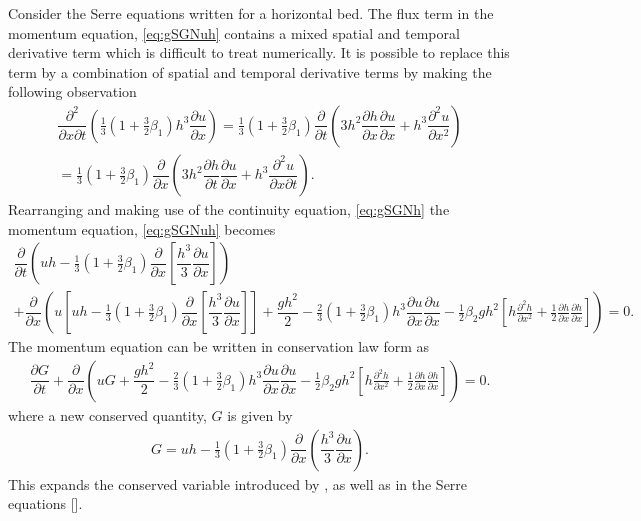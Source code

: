 \documentclass[10pt]{article}
\begin{document}
Consider the Serre equations written for a horizontal bed. The flux term in the momentum equation, \eqref{eq:gSGNuh} contains a mixed spatial and temporal derivative term which is difficult to treat numerically. It is possible to replace this term  by a combination of spatial and temporal derivative terms by making the following observation
\begin{multline}
\dfrac{\partial^2}{\partial x \partial t} \left ( \frac{1}{3}\left(1 + \frac{3}{2} \beta_1\right) h^3 \dfrac{\partial u}{\partial x} \right ) =   \frac{1}{3}\left(1 + \frac{3}{2} \beta_1\right) \dfrac{\partial }{\partial t} \left ( 3h^2 \dfrac{\partial h}{\partial x} \dfrac{\partial u}{\partial x} + h^3 \dfrac{\partial^2 u}{\partial x^2} \right ) \\=  \frac{1}{3}\left(1 + \frac{3}{2} \beta_1\right)
\dfrac{\partial }{\partial x} \left ( 3 h^2 \dfrac{\partial h}{\partial t} \dfrac{\partial u}{\partial x} + h^3 \dfrac{\partial^2 u}{\partial x \partial t} \right ).
\end{multline}
Rearranging and making use of the continuity equation, \eqref{eq:gSGNh} the momentum equation, \eqref{eq:gSGNuh} becomes
\begin{multline}
\dfrac{\partial }{\partial t} \left ( u h -  \frac{1}{3}\left(1 + \frac{3}{2} \beta_1\right) \dfrac{\partial}{\partial x} \left [ \dfrac{h^3}{3} \dfrac{\partial u}{\partial x}  \right ] \right ) \\ + \dfrac{\partial}{\partial x} \left ( u\left[uh - \frac{1}{3}\left(1 + \frac{3}{2} \beta_1\right) \dfrac{\partial }{\partial x} \left [ \dfrac{h^3}{3} \dfrac{\partial u}{\partial x} \right ]\right] + \dfrac{gh^2}{2} - \frac{2}{3}\left(1 + \frac{3}{2} \beta_1\right) h^3\dfrac{\partial u}{\partial x}\dfrac{\partial u}{\partial x}  - \frac{1}{2} \beta_2 g h^2 \left[h\frac{\partial^2 h}{\partial x^2} + \frac{1}{2}\frac{\partial h}{\partial x}\frac{\partial h}{\partial x}\right]\right ) = 0.
\end{multline}
The momentum equation can be written in conservation law form as
\begin{gather}\label{eq:G_momentum}
\dfrac{\partial G }{\partial t}  + \dfrac{\partial}{\partial x} \left ( uG + \dfrac{gh^2}{2} - \frac{2}{3}\left(1 + \frac{3}{2} \beta_1\right) h^3\dfrac{\partial u}{\partial x}\dfrac{\partial u}{\partial x}  - \frac{1}{2} \beta_2 g h^2  \left[h\frac{\partial^2 h}{\partial x^2} + \frac{1}{2}\frac{\partial h}{\partial x}\frac{\partial h}{\partial x}\right]\right ) = 0.
\end{gather}
where a new conserved quantity, $G$ is given by
\begin{gather*}
G = uh - \frac{1}{3}\left(1 + \frac{3}{2} \beta_1\right) \dfrac{\partial }{\partial x} \left ( \dfrac{h^3}{3} \dfrac{\partial u}{\partial x} \right ).
\end{gather*}
This expands the conserved variable introduced by \cite{Clamond-Dutykh-2018-237}, as well as in the Serre equations []. 
\end{document}
